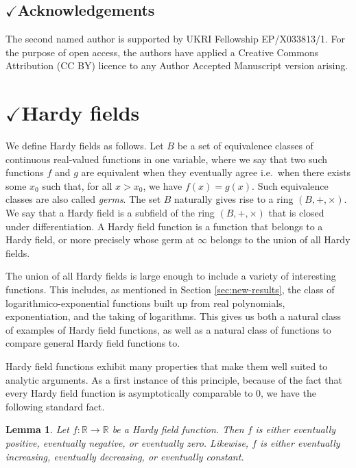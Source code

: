 \documentclass{amsart}
\newtheorem{lemma}[theorem]{Lemma}
\theoremstyle{definition}
\newcommand{\RR}{\mathbb{R}}
\begin{document}
\subsection*{$\checkmark$Acknowledgements}

The second named author is supported by UKRI Fellowship EP/X033813/1. For the purpose of open access, the authors have applied a Creative Commons Attribution (CC BY) licence to any Author Accepted Manuscript version arising.

 


\section{$\checkmark$Hardy fields}
\label{sec:hardy}

We define Hardy fields as follows. Let $B$ be a set of equivalence classes of continuous real-valued functions in one variable, where we say that two such functions $f$ and $g$ are equivalent when they eventually agree i.e.\ when there exists some $x_0$ such that, for all $x > x_0$, we have $f(x) = g(x)$. Such equivalence classes are also called \emph{germs}. The set $B$ naturally gives rise to a ring $(B, +, \times)$. We say that a Hardy field is a subfield of the ring $(B, +, \times)$ that is closed under differentiation. A Hardy field function is a function that belongs to a Hardy field, or more precisely whose germ at $\infty$ belongs to the union of all Hardy fields.

The union of all Hardy fields is large enough to include a variety of interesting functions. This includes, as mentioned in Section \ref{sec:new-results}, the class of logarithmico-exponential functions built up from real polynomials, exponentiation, and the taking of logarithms. This gives us both a natural class of examples of Hardy field functions, as well as a natural class of functions to compare general Hardy field functions to.

Hardy field functions exhibit many properties that make them well suited to analytic arguments. As a first instance of this principle, because of the fact that every Hardy field function is asymptotically comparable to $0$, we have the following standard fact. 

\begin{lemma} \label{lem:eventually-increasing-or-decreasing}
	Let $f \colon \RR \to \RR$ be a Hardy field function.
	Then $f$ is either eventually positive, eventually negative, or eventually zero. Likewise, $f$ is either eventually increasing, eventually decreasing, or eventually constant.
\end{lemma}
\end{document}
